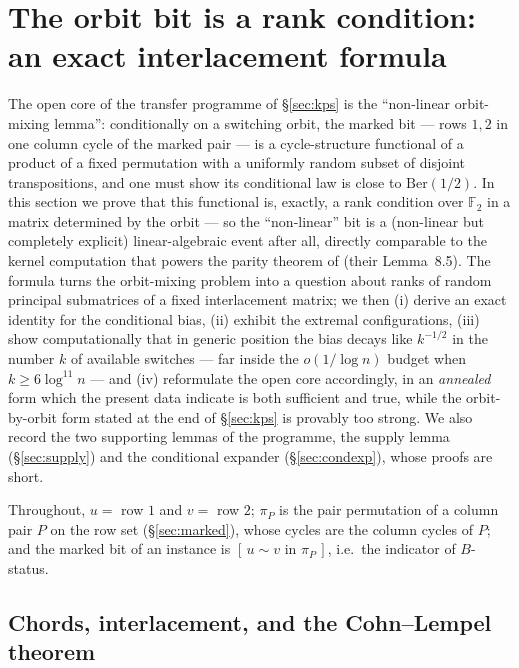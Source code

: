 \section{The orbit bit is a rank condition: an exact interlacement
formula}\label{sec:orbit}

The open core of the transfer programme of \S\ref{sec:kps} is the
``non-linear orbit-mixing lemma'': conditionally on a switching orbit,
the marked bit --- rows $1,2$ in one column cycle of the marked pair
--- is a cycle-structure functional of a product of a fixed
permutation with a uniformly random subset of disjoint transpositions,
and one must show its conditional law is close to $\mathrm{Ber}(1/2)$.
In this section we prove that this functional is, exactly, a rank
condition over $\mathbb{F}_2$ in a matrix determined by the orbit ---
so the ``non-linear'' bit is a (non-linear but completely explicit)
linear-algebraic event after all, directly comparable to the kernel
computation that powers the parity theorem of \cite{KPS25} (their
Lemma~8.5).  The formula turns the orbit-mixing problem into a
question about ranks of random principal submatrices of a fixed
interlacement matrix; we then (i) derive an exact identity for the
conditional bias, (ii) exhibit the extremal configurations, (iii)
show computationally that in generic position the bias decays like
$k^{-1/2}$ in the number $k$ of available switches --- far inside the
$o(1/\log n)$ budget when $k\ge6\log^{11}n$ --- and (iv) reformulate
the open core accordingly, in an \emph{annealed} form which the
present data indicate is both sufficient and true, while the
orbit-by-orbit form stated at the end of \S\ref{sec:kps} is provably
too strong.  We also record the two supporting lemmas of the
programme, the supply lemma (\S\ref{sec:supply}) and the conditional
expander (\S\ref{sec:condexp}), whose proofs are short.

Throughout, $u=$ row $1$ and $v=$ row $2$; $\pi_P$ is the pair
permutation of a column pair $P$ on the row set (\S\ref{sec:marked}),
whose cycles are the column cycles of $P$; and the marked bit of an
instance is $[\,u\sim v \text{ in } \pi_P\,]$, i.e.\ the indicator of
$B$-status.

\subsection{Chords, interlacement, and the Cohn--Lempel theorem}

